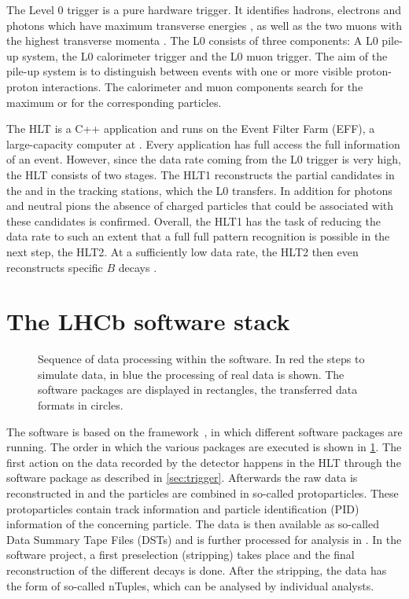 The Level 0 trigger is a pure hardware trigger.
It identifies hadrons, electrons and photons which have maximum transverse energies \et, as well as the two muons with the highest transverse momenta \pt.
The L0 consists of three components: A L0 pile-up system, the L0 calorimeter trigger and the L0 muon trigger.
The aim of the pile-up system is to distinguish between events with one or more visible proton-proton interactions.
The calorimeter and muon components search for the maximum \et or \pt for the corresponding particles.

The HLT is a C++ application and runs on the Event Filter Farm (EFF), a large-capacity computer at \cern.
Every application has full access the full information of an event.
However, since the data rate coming from the L0 trigger is very high, the HLT consists of two stages.
The HLT1 reconstructs the partial candidates in the \velo and in the tracking stations, which the L0 transfers.
In addition for photons and neutral pions the absence of charged particles that could be associated with these candidates is confirmed.
Overall, the HLT1 has the task of reducing the data rate to such an extent that a full full pattern recognition is possible in the next step, the HLT2.
At a sufficiently low data rate, the HLT2 then even reconstructs specific $B$ decays .

\section{The LHCb software stack}

\begin{figure}[tbp]
    \centering
    
    \caption{Sequence of data processing within the \lhcb software.
    In red the steps to simulate data, in blue the processing of real data is shown.
    The software packages are displayed in rectangles, the transferred data formats in circles.}
    \label{fig:lhcbsoftware}
\end{figure}
The \lhcb software is based on the \gaudi framework~\cite{Barrand:2001ny}, in which different software packages are running.
The order in which the various packages are executed is shown in \cref{fig:lhcbsoftware}.
The first action on the data recorded by the detector happens in the HLT through the software package \moore \cite{Aaij:2012me, Albrecht:2013fba} as described in \cref{sec:trigger}.
Afterwards the raw data is reconstructed in \brunel \cite{Szumlak:2007zz, VanderEijk:2001wqa, Kucharczyk:1756296} and the particles are combined in so-called protoparticles.
These protoparticles contain track information and particle identification (PID) information of the concerning particle.
The data is then available as so-called Data Summary Tape Files (DSTs) and is further processed for analysis in \davinci.
In the \davinci software project, a first preselection (stripping) takes place and the final reconstruction of the different decays is done.
After the stripping, the data has the form of so-called nTuples, which can be analysed by individual analysts.

